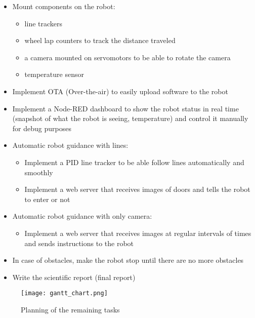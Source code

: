 \documentclass{article}
\begin{document}
\begin{itemize}
    \item Mount components on the robot:
        \begin{itemize}
            \item line trackers
            \item wheel lap counters to track the distance traveled
            \item a camera mounted on servomotors to be able to rotate the camera
            \item temperature sensor
        \end{itemize}
    \item Implement OTA (Over-the-air) to easily upload software to the robot
    \item Implement a Node-RED dashboard to show the robot status in real time (snapshot of what the robot is seeing, temperature) and control it manually for debug purposes
    \item Automatic robot guidance with lines:
        \begin{itemize}
            \item Implement a PID line tracker to be able follow lines automatically and smoothly
            \item Implement a web server that receives images of doors and tells the robot to enter or not
        \end{itemize}
    \item Automatic robot guidance with only camera:
        \begin{itemize}
            \item Implement a web server that receives images at regular intervals of times and sends instructions to the robot
        \end{itemize}
    \item In case of obstacles, make the robot stop until there are no more obstacles
    \item Write the scientific report (final report)
\end{itemize}

\begin{figure}
\centering
\texttt{[image: gantt\_chart.png]}
\caption{\label{fig:gantt_chart}Planning of the remaining tasks}
\end{figure}
\end{document}
